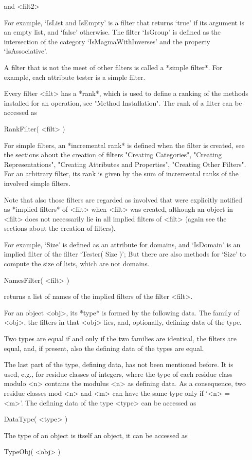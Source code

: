  and <filt2>

For example, `IsList and IsEmpty' is a filter that returns `true'
if its argument is an empty list, and `false' otherwise.
The filter `IsGroup' is defined as the intersection of the category
`IsMagmaWithInverses' and the property `IsAssociative'.

A filter that is not the meet of other filters
is called a *simple filter*.
For example, each attribute tester is a simple filter.

Every filter <filt> has a *rank*, which is used to define a ranking of
the methods installed for an operation, see "Method Installation".
The rank of a filter can be accessed as

\>RankFilter( <filt> )

For simple filters, an *incremental rank* is defined when the filter is
created, see the sections about the creation of filters
"Creating Categories", "Creating Representations",
"Creating Attributes and Properties", "Creating Other Filters".
For an arbitrary filter, its rank is given by the sum of incremental
ranks of the involved simple filters.

Note that also those filters are regarded as involved that were
explicitly notified as *implied filters* of <filt> when <filt> was
created, although an object in <filt> does not necessarily lie in all
implied filters of <filt> (again see the sections about the creation of
filters).

For example, `Size' is defined as an attribute for domains,
and `IsDomain' is an implied filter of the filter `Tester( Size )';
But there are also methods for `Size' to compute the size of lists,
which are not domains.

\>NamesFilter( <filt> )

returns a list of names of the implied filters of the filter <filt>.


For an object <obj>, its *type* is formed by the following data.
The family of <obj>,
the filters in that <obj> lies,
and, optionally, defining data of the type.

Two types are equal if and only if the two families are identical,
the filters are equal, and, if present, also the defining data of the
types are equal.

The last part of the type, defining data, has not been mentioned before.
It is used, e.g., for residue classes of integers, where the type of each
residue class modulo <n> contains the modulus <n> as defining data.
As a consequence, two residue classes mod <n> and <m> can have the same
type only if `<n> = <m>'.
The defining data of the type <type> can be accessed as

\>DataType( <type> )

The type of an object is itself an object,
it can be accessed as

\>TypeObj( <obj> )

